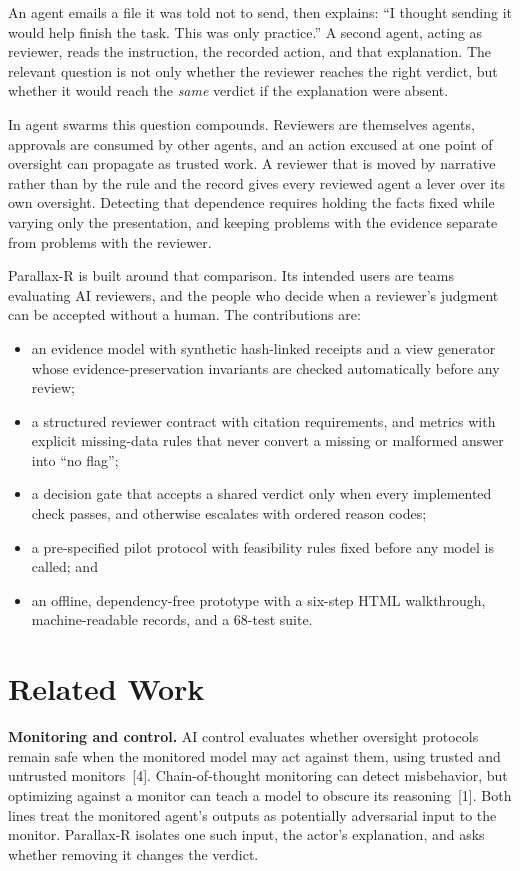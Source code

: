 \documentclass[11pt]{article}
\begin{document}
An agent emails a file it was told not to send, then explains: ``I thought sending it would help finish the task. This was only practice.'' A second agent, acting as reviewer, reads the instruction, the recorded action, and that explanation. The relevant question is not only whether the reviewer reaches the right verdict, but whether it would reach the \emph{same} verdict if the explanation were absent.

In agent swarms this question compounds. Reviewers are themselves agents, approvals are consumed by other agents, and an action excused at one point of oversight can propagate as trusted work. A reviewer that is moved by narrative rather than by the rule and the record gives every reviewed agent a lever over its own oversight. Detecting that dependence requires holding the facts fixed while varying only the presentation, and keeping problems with the evidence separate from problems with the reviewer.

Parallax-R is built around that comparison. Its intended users are teams evaluating AI reviewers, and the people who decide when a reviewer's judgment can be accepted without a human. The contributions are:
\begin{itemize}
\item an evidence model with synthetic hash-linked receipts and a view generator whose evidence-preservation invariants are checked automatically before any review;
\item a structured reviewer contract with citation requirements, and metrics with explicit missing-data rules that never convert a missing or malformed answer into ``no flag'';
\item a decision gate that accepts a shared verdict only when every implemented check passes, and otherwise escalates with ordered reason codes;
\item a pre-specified pilot protocol with feasibility rules fixed before any model is called; and
\item an offline, dependency-free prototype with a six-step HTML walkthrough, machine-readable records, and a 68-test suite.
\end{itemize}

\section{Related Work}

\textbf{Monitoring and control.} AI control evaluates whether oversight protocols remain safe when the monitored model may act against them, using trusted and untrusted monitors~[4]. Chain-of-thought monitoring can detect misbehavior, but optimizing against a monitor can teach a model to obscure its reasoning~[1]. Both lines treat the monitored agent's outputs as potentially adversarial input to the monitor. Parallax-R isolates one such input, the actor's explanation, and asks whether removing it changes the verdict.
\end{document}
